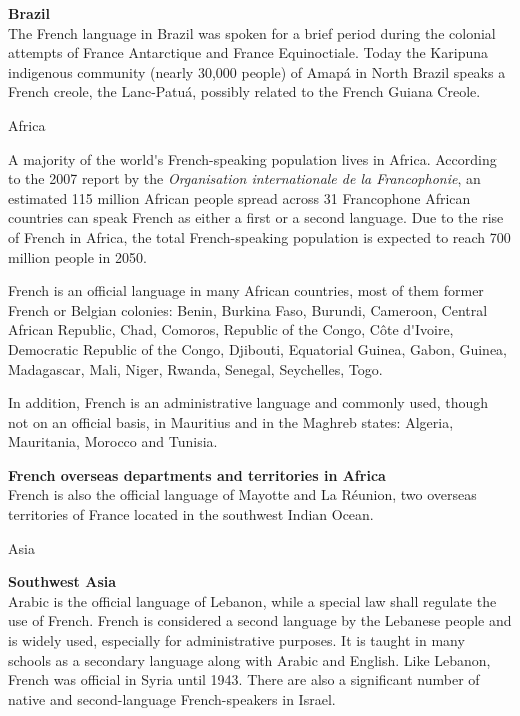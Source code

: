 \begin{multicols}{2}
{\bf Brazil}\\
The French language in Brazil was spoken for a brief period during the
colonial attempts of France Antarctique and France Equinoctiale. Today
the Karipuna indigenous community (nearly 30,000 people) of Amapá in
North Brazil speaks a French creole, the Lanc-Patuá, possibly related
to the French Guiana Creole.

\begin{center}
{\sc Africa}
\end{center}

A majority of the world{\mbox '}s French-speaking population lives in
Africa. According to the 2007 report by the {\em Organisation
internationale de la Francophonie}, an estimated 115 million African
people spread across 31 Francophone African countries can speak French
as either a first or a second language. Due to the rise of French in
Africa, the total French-speaking population is expected to reach 700
million people in 2050.

French is an official language in many African countries, most of them
former French or Belgian colonies: Benin, Burkina Faso, Burundi,
Cameroon, Central African Republic, Chad, Comoros, Republic of the
Congo, Côte d{\mbox '}Ivoire, Democratic Republic of the Congo, Djibouti,
Equatorial Guinea, Gabon, Guinea, Madagascar, Mali, Niger, Rwanda,
Senegal, Seychelles, Togo.

In addition, French is an administrative language and commonly used,
though not on an official basis, in Mauritius and in the Maghreb
states: Algeria, Mauritania, Morocco and Tunisia.

{\bf French overseas departments and territories in Africa}\\
French is also the official language of Mayotte and La Réunion, two
overseas territories of France located in the southwest Indian Ocean.

\begin{center}
{\sc Asia}
\end{center}

{\bf Southwest Asia}\\ 
Arabic is the official language of Lebanon, while a special law shall
regulate the use of French. French is considered a second language by
the Lebanese people and is widely used, especially for administrative
purposes. It is taught in many schools as a secondary language along
with Arabic and English. Like Lebanon, French was official in Syria
until 1943. There are also a significant number of native and
second-language French-speakers in Israel.


\end{multicols}
